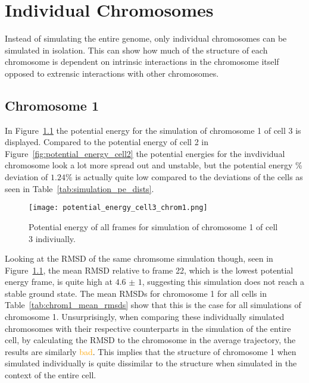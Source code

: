 
\chapter{Individual Chromosomes} %
\label{cha:individual_chromosomes}

Instead of simulating the entire genome, only individual chromosomes can be simulated in isolation. This can show how much of the structure of each chromosome is dependent on intrinsic interactions in the chromosome itself opposed to extrensic interactions with other chromosomes.

\section{Chromosome 1} %
\label{sec:chromosome_1}

In Figure~\ref{fig:potential_energy_cell3_chrom1} the potential energy for the simulation of chromosome 1 of cell 3 is displayed. Compared to the potential energy of cell 2 in Figure~\ref{fig:potential_energy_cell2} the potential energies for the invdividual chromosome look a lot more spread out and unstable, but the potential energy \% deviation of \(1.24 \%\) is actually quite low compared to the deviations of the cells as seen in Table~\ref{tab:simulation_pe_dists}. 

\begin{figure}[ht]
\centering
	\texttt{[image: potential\_energy\_cell3\_chrom1.png]}
	\caption{Potential energy of all frames for simulation of chromosome 1 of cell 3 indiviually.}
	\label{fig:potential_energy_cell3_chrom1}
\end{figure}

Looking at the RMSD of the same chromsome simulation though, seen in Figure~\ref{fig:potential_energy_cell3_chrom1}, the mean RMSD relative to frame 22, which is the lowest potential energy frame, is quite high at \(\num{4.6(10)}\), suggesting this simulation does not reach a stable ground state. The mean RMSDs for chromosome 1 for all cells in Table~\ref{tab:chrom1_mean_rmsds} show that this is the case for all simulations of chromosome 1. Unsurprisingly, when comparing these individually simulated chromosomes with their respective counterparts in the simulation of the entire cell, by calculating the RMSD to the chromosome in the average trajectory, the results are similarly \textcolor{orange}{bad}. This implies that the structure of chromosome 1 when simulated individually is quite dissimilar to the structure when simulated in the context of the entire cell.

